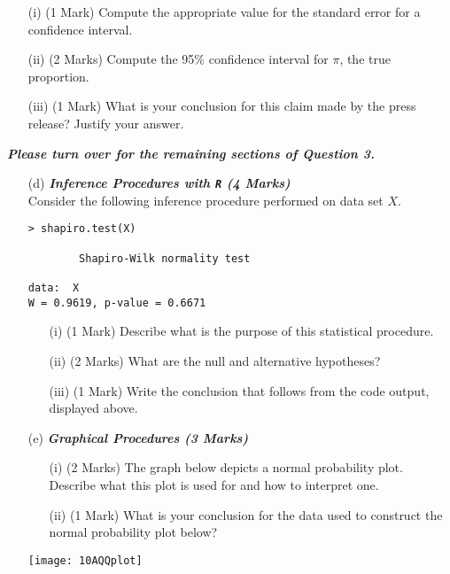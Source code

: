 \documentclass[a4paper,12pt]{article}
\begin{document}
\begin{itemize}
\begin{itemize}
\item[(i)] (1 Mark) Compute the appropriate value for the standard error for a confidence interval.
\item[(ii)] (2 Marks) Compute the 95\% confidence interval for $\pi$, the true proportion.
\item[(iii)] (1 Mark) What is your conclusion for this claim made by the press release? Justify your answer.
\end{itemize}
\end{itemize}
{
\normalsize
\textit{\textbf{Please turn over for the remaining sections of Question 3.}}
}
%
\newpage
\begin{itemize}
\item[(d)] \textbf{\textit{ Inference Procedures with \texttt{R} (4 Marks)}}\\
Consider the following inference procedure performed on data set $X$.
\begin{center}
\begin{framed}
\begin{verbatim}
> shapiro.test(X)

        Shapiro-Wilk normality test

data:  X
W = 0.9619, p-value = 0.6671

\end{verbatim}
\end{framed}
\end{center}

\begin{itemize}
\item[(i)] (1 Mark) Describe what is the purpose of this statistical procedure.
\item[(ii)] (2 Marks) What are the null and alternative hypotheses?
\item[(iii)] (1 Mark) Write the conclusion that follows from the code output, displayed above.
\end{itemize}
\end{itemize}

\begin{itemize}
\item[(e)] \textbf{\textit{Graphical Procedures (3 Marks)}}
\begin{itemize}
\item[(i)] (2 Marks) The graph below depicts a normal probability plot. Describe what this plot is used for and how to interpret one.
\item[(ii)](1 Mark) What is your conclusion for the data used to construct the normal probability plot below?
\end{itemize}
\begin{center}
\texttt{[image: 10AQQplot]}
\end{center}
\end{itemize}
\end{document}
